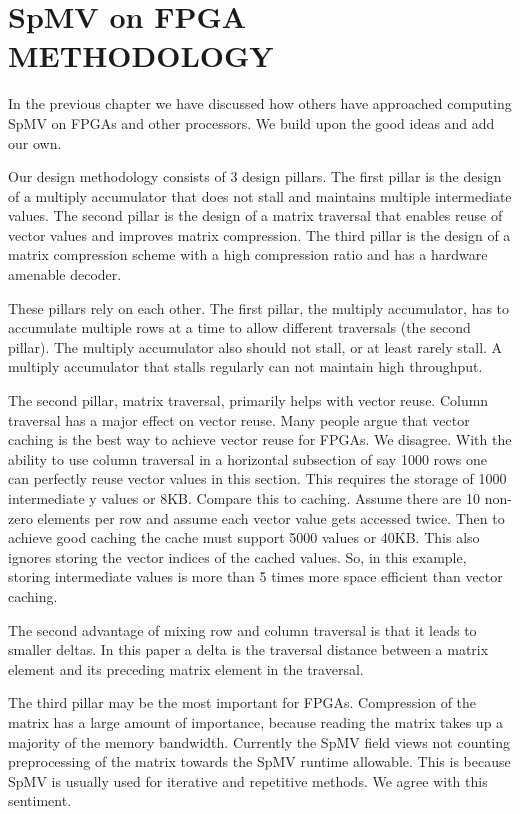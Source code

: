 \chapter{SpMV on FPGA METHODOLOGY}
In the previous chapter we have discussed how others have approached computing SpMV on FPGAs and other processors. We build upon the good ideas and add our own.
\par Our design methodology consists of 3 design pillars. The first pillar is the design of a multiply accumulator that does not stall and maintains multiple intermediate values. The second pillar is the design of a matrix traversal that enables reuse of vector values and improves matrix compression. The third pillar is the design of a matrix compression scheme with a high compression ratio and has a hardware amenable decoder.
\par These pillars rely on each other. The first pillar, the multiply accumulator, has to accumulate multiple rows at a time to allow different traversals (the second pillar). The multiply accumulator also should not stall, or at least rarely stall. A multiply accumulator that stalls regularly can not maintain high throughput.
\par The second pillar, matrix traversal, primarily helps with vector reuse. Column traversal has a major effect on vector reuse. Many people argue that vector caching is the best way to achieve vector reuse for FPGAs. We disagree. With the ability to use column traversal in a horizontal subsection of say 1000 rows one can perfectly reuse vector values in this section. This requires the storage of 1000 intermediate y values or 8KB. Compare this to caching. Assume there are 10 non-zero elements per row and assume each vector value gets accessed twice. Then to achieve good caching the cache must support 5000 values or 40KB. This also ignores storing the vector indices of the cached values. So, in this example, storing intermediate values is more than 5 times more space efficient than vector caching.
\par The second advantage of mixing row and column traversal is that it leads to smaller deltas. In this paper a delta is the traversal distance between a matrix element and its preceding matrix element in the traversal.
\par The third pillar may be the most important for FPGAs. Compression of the matrix has a large amount of importance, because reading the matrix takes up a majority of the memory bandwidth. Currently the SpMV field views not counting preprocessing of the matrix towards the SpMV runtime allowable. This is because SpMV is usually used for iterative and repetitive methods. We agree with this sentiment.
